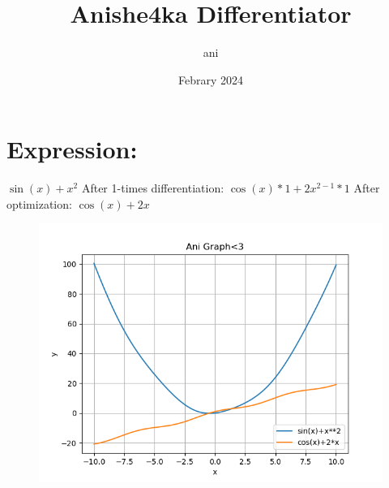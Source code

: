\documentclass{article}
\title{Anishe4ka Differentiator}
\author{ani}
\date{Febrary 2024}
\begin{document}
\maketitle
\newpage
\section{Expression:}
$\sin(x)+{x}^{2}$\newline\newline
After 1-times differentiation:\newline
$\cos(x)*1+2{x}^{2-1}*1$\newline\newline
After optimization:\newline
$\cos(x)+2x$\newline\newline
\begin{figure} [!ht]
\begin{flushleft}
\includegraphics[scale = 0.700000]{figs/fig0.png}
\end{flushleft}
\end{figure}
\newpage
\end{document}
